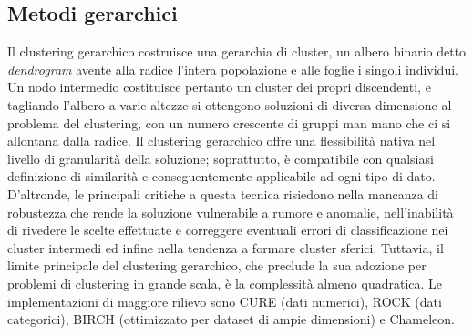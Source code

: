 \subsection{Metodi gerarchici}
Il clustering gerarchico costruisce una gerarchia di cluster, un albero binario detto \textit{dendrogram} avente alla radice l'intera popolazione e alle foglie i singoli individui. Un nodo intermedio costituisce pertanto un cluster dei propri discendenti, e tagliando l'albero a varie altezze si ottengono soluzioni di diversa dimensione al problema del clustering, con un numero crescente di gruppi man mano che ci si allontana dalla radice.
Il clustering gerarchico offre una flessibilit\`a nativa nel livello di granularit\`a della soluzione; soprattutto, \`e  compatibile con qualsiasi definizione di similarit\`a e conseguentemente applicabile ad ogni tipo di dato. D'altronde, le principali critiche a questa tecnica risiedono nella mancanza di robustezza che rende la soluzione vulnerabile a rumore e anomalie, nell'inabilit\`a di rivedere le scelte effettuate e correggere eventuali errori di classificazione nei cluster intermedi ed infine nella tendenza a formare cluster sferici. Tuttavia, il limite principale del clustering gerarchico, che preclude la sua adozione per problemi di clustering in grande scala, \`e la complessit\`a almeno quadratica. Le implementazioni di maggiore rilievo sono CURE (dati numerici), ROCK (dati categorici), BIRCH (ottimizzato per dataset di ampie dimensioni) e Chameleon.

